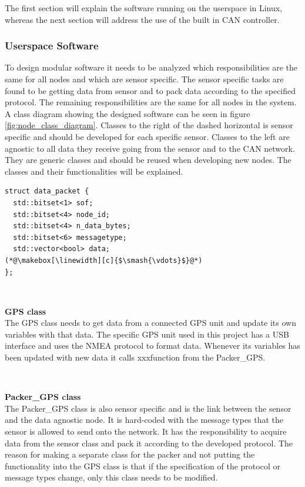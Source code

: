 The first section will explain the software running on the userspace in Linux, whereas the next section will address the use of the built in CAN controller.	

\subsubsection*{Userspace Software}
To design modular software it needs to be analyzed which responsibilities are the same for all nodes and which are sensor specific.
The sensor specific tasks are found to be getting data from sensor and to pack data according to the specified protocol.
The remaining responsibilities are the same for all nodes in the system. 
A class diagram showing the designed software can be seen in figure \ref{fig:node_class_diagram}.
Classes to the right of the dashed horizontal is sensor specific and should be developed for each specific sensor.
Classes to the left are agnostic to all data they receive going from the sensor and to the CAN network.
They are generic classes and should be reused when developing new nodes.
The classes and their functionalities will be explained.


\begin{lstlisting}[caption=Struct for data packet.,label=code:data_packet]
struct data_packet {
  std::bitset<1> sof;
  std::bitset<4> node_id;
  std::bitset<4> n_data_bytes;
  std::bitset<6> messagetype;
  std::vector<bool> data;
(*@\makebox[\linewidth][c]{$\smash{\vdots}$}@*)
};
\end{lstlisting}


~\\ \par \textbf{GPS class} ~ \\
The GPS class needs to get data from a connected GPS unit and update its own variables with that data.
The specific GPS unit used in this project has a USB interface and uses the NMEA protocol to format data.
Whenever its variables has been updated with new data it calls xxxfunction from the Packer\_GPS.

~\\ \par \textbf{Packer\_GPS class} ~ \\
The Packer\_GPS class is also sensor specific and is the link between the sensor and the data agnostic node.
It is hard-coded with the message types that the sensor is allowed to send onto the network.
It has the responsibility to acquire data from the sensor class and pack it according to the developed protocol.
The reason for making a separate class for the packer and not putting the functionality into the GPS class is that if the specification of the protocol or message types change, only this class needs to be modified.

